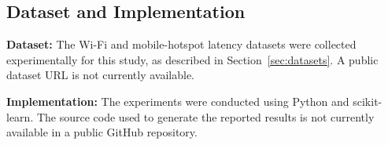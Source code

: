 \documentclass[pdflatex,sn-mathphys-num]{sn-jnl}
\begin{document}
\subsection{Dataset and Implementation}

\textbf{Dataset:} The Wi-Fi and mobile-hotspot latency datasets were collected experimentally for this study, as described in Section~\ref{sec:datasets}. A public dataset URL is not currently available.

\textbf{Implementation:} The experiments were conducted using Python and scikit-learn. The source code used to generate the reported results is not currently available in a public GitHub repository.
\end{document}
